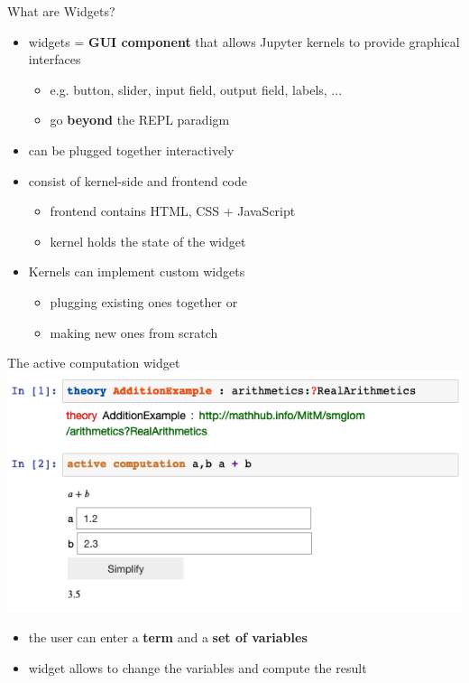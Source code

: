 \documentclass{beamer}
\begin{document}
    \begin{frame}{What are Widgets?}
        \begin{itemize}
            \item widgets = \textbf{GUI component} that allows Jupyter kernels to provide graphical interfaces
            \begin{itemize}
                \item e.g. button, slider, input field, output field, labels, ...
                \item go \textbf{beyond} the REPL paradigm
            \end{itemize}

            \item can be plugged together interactively
            \item consist of kernel-side and frontend code
            \begin{itemize}
                \item frontend contains HTML, CSS + JavaScript
                \item kernel holds the state of the widget
            \end{itemize}
            \item Kernels can implement custom widgets
            \begin{itemize}
                \item plugging existing ones together or
                \item making new ones from scratch
            \end{itemize}
        \end{itemize}
    \end{frame}

    \begin{frame}{The active computation widget}
        \includegraphics[scale=.5]{images/activecomp}
        \begin{itemize}
            \item the user can enter a \textbf{term} and a \textbf{set of variables}
            \item widget allows to change the variables and compute the result
        \end{itemize}
    \end{frame}
\end{document}
